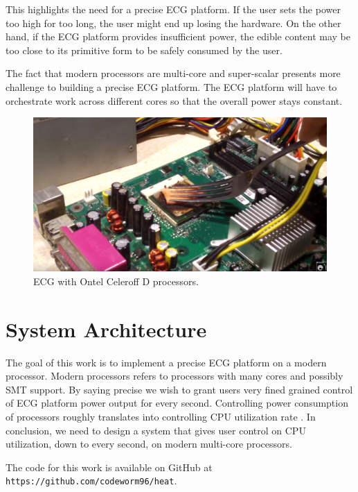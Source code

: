 \documentclass[conference]{IEEEtran}
\begin{document}
This highlights the need for a precise ECG platform. If the user sets the power too high for too long, the user might end up losing the hardware. On the other hand, if the ECG platform provides insufficient power, the edible content may be too close to its primitive form to be safely consumed by the user.

The fact that modern processors are multi-core and super-scalar presents more challenge to building a precise ECG platform. The ECG platform will have to orchestrate work across different cores so that the overall power stays constant.

\begin{figure}[htbp]
\centerline{\includegraphics[scale=.25]{fig/intel}}
\caption{ECG with Ontel Celeroff D processors.}
\label{intelcook}
\end{figure}

\section{System Architecture}
The goal of this work is to implement a precise ECG platform on a modern processor. 
Modern processors refers to processors with many cores and possibly SMT support. By
saying precise we wish to grant users very fined grained control of ECG platform power
output for every second. Controlling power consumption of processors roughly translates
into controlling CPU utilization rate \cite{fan2007power}. In conclusion, we need to
design a system that gives user control on CPU utilization, down to every second, on 
modern multi-core processors. 

The code for this work is available on GitHub at \texttt{https://github.com/codeworm96/heat}.
\end{document}
